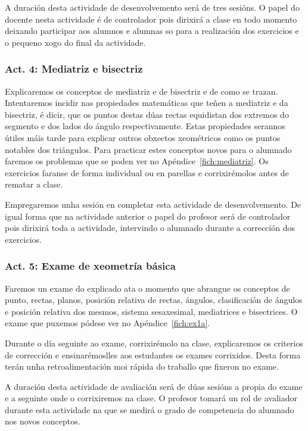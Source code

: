 A duración desta actividade de desenvolvemento será de tres sesións. O papel do docente nesta actividade é de controlador pois dirixirá a clase en todo momento deixando participar aos alumnos e alumnas so para a realización dos exercicios e o pequeno xogo do final da actividade.

\subsubsection{Act. 4: Mediatriz e bisectriz}\label{act:mediatriz}
Explicaremos os conceptos de mediatriz e de bisectriz e de como se trazan. Intentaremos incidir nas propiedades matemáticas que teñen a mediatriz e da bisectriz, é dicir, que os puntos destas dúas rectas equidistan dos extremos do segmento e dos lados do ángulo respectivamente. Estas propiedades serannos útiles máis tarde para explicar outros obxectos xeométricos como os puntos notables dos triángulos. Para practicar estes conceptos novos para o alumnado faremos os problemas que se poden ver no Apéndice~\ref{fich:mediatriz}. Os exercicios faranse de forma individual ou en parellas e corrixirémolos antes de rematar a clase.

Empregaremos unha sesión en completar esta actividade de desenvolvemento. De igual forma que na actividade anterior o papel do profesor será de controlador pois dirixirá toda a actividade, intervindo o alumnado durante a corrección dos exercicios.

\subsubsection{Act. 5: Exame de xeometría básica}\label{act:examen1}
Faremos un exame do explicado ata o momento que abrangue os conceptos de punto, rectas, planos, posición relativa de rectas, ángulos, clasificación de ángulos e posición relativa dos mesmos, sistema sesaxesimal, mediatrices e bisectrices. O exame que puxemos pódese ver no Apéndice~\ref{fich:ex1a}.

Durante o día seguinte ao exame, corrixirémolo na clase, explicaremos os criterios de corrección e ensinarémoslles aos estudantes os exames corrixidos. Desta forma terán unha retroalimentación moi rápida do traballo que fixeron no exame.

A duración desta actividade de avaliación será de dúas sesións a propia do exame e a seguinte onde o corrixiremos na clase. O profesor tomará un rol de avaliador durante esta actividade na que se medirá o grado de competencia do alumnado nos novos conceptos.

